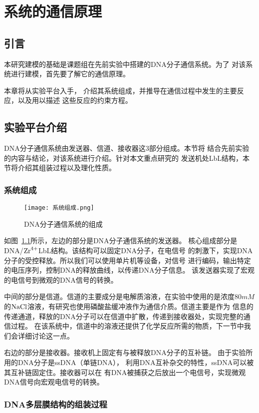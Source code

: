 \chapter{系统的通信原理}
\section{引言}
本研究建模的基础是课题组在先前实验中搭建的DNA分子通信系统。为了
对该系统进行建模，首先要了解它的通信原理。

本章将从实验平台入手，
介绍其系统组成，并推导在通信过程中发生的主要反应，以及用以描述
这些反应的约束方程。
\section{实验平台介绍}
DNA分子通信系统由发送器、信道、接收器这3部分组成。本节将
结合先前实验的内容与结论，对该系统进行介绍。针对本文重点研究的
发送机处LbL结构，本节将介绍其组装过程以及理化性质。
\subsection{系统组成}

\begin{figure}[htb]
    \centering
    \texttt{[image: 系统组成.png]}
    \caption{DNA分子通信系统的组成}
    \label{fig:系统组成}
\end{figure}

如图~\ref{fig:系统组成}所示，左边的部分是DNA分子通信系统的发送器。
核心组成部分是DNA/$\ce{Zr^4+}$LbL结构。该结构可以固定DNA分子，在电信号
的刺激下，实现DNA分子的受控释放。所以我们可以使用单片机等设备，对信号
进行编码，输出特定的电压序列，控制DNA的释放曲线，以传递DNA分子信息。
该发送器实现了宏观的电信号到微观的DNA信号的转换。

中间的部分是信道。信道的主要成分是电解质溶液，在实验中使用的是浓度80$mM$
的$\ce{NaCl}$溶液，有研究也使用磷酸盐缓冲液作为通信介质。信道主要是作为
信息的传递通道，释放的DNA分子可以在信道中扩散，传递到接收器处，实现完整的通信过程。
在该系统中，信道中的溶液还提供了化学反应所需的物质，下一节中我们会详细讨论这一点。

右边的部分是接收器。接收机上固定有与被释放DNA分子的互补链。
由于实验所用的DNA分子是ssDNA（单链DNA），
利用DNA互补杂交的特性，ssDNA可以被其互补链固定住。接收器可以在
有DNA被捕获之后放出一个电信号，实现微观DNA信号向宏观电信号的转换。

\subsection{DNA多层膜结构的组装过程}

